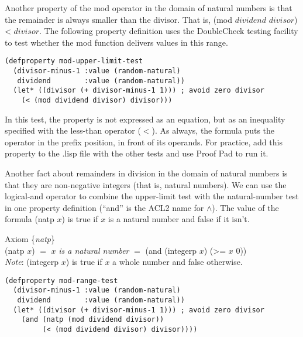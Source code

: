 Another property of the \textsf{mod} operator
in the domain of natural numbers
is that the remainder
is always smaller than the divisor.
That is, \textsf{(mod $dividend$ $divisor$)} < $divisor$.
The following property definition uses
the DoubleCheck testing facility
to test whether the \textsf{mod} function delivers values in this range.

\begin{Verbatim}
(defproperty mod-upper-limit-test
  (divisor-minus-1 :value (random-natural)
   dividend        :value (random-natural))
  (let* ((divisor (+ divisor-minus-1 1))) ; avoid zero divisor
    (< (mod dividend divisor) divisor)))
\end{Verbatim}

In this test, the property is not expressed as an equation,
but as an inequality
specified with the less-than operator ($<$).
As always, the formula puts the operator in the prefix position,
in front of its operands.
For practice, add this property to the .lisp file with the other tests and 
use Proof Pad to run it.

Another fact about remainders in division in the domain of natural numbers is that
they are non-negative integers (that is, natural numbers).
We can use the logical-and operator
to combine the upper-limit test with the natural-number test
in one property definition
(``\textsf{and}'' is the ACL2 name for $\wedge$).
\label{natp-op}The value of the formula 
\textsf{(natp $x$)} is true
if $x$ is a natural number and false if it isn't.

\label{natp-axiom-formal}
\begin{center}
Axiom \{\emph{natp}\} \\
(natp $x$) $=$ $x$ \emph{is a natural number} $=$ \textsf{(and (integerp $x$) (>= $x$ 0))}\\
\emph{Note}: \textsf{(integerp $x$)} is true if $x$ a whole number and false otherwise.
\end{center}

\begin{Verbatim}
(defproperty mod-range-test
  (divisor-minus-1 :value (random-natural)
   dividend        :value (random-natural))
  (let* ((divisor (+ divisor-minus-1 1))) ; avoid zero divisor
    (and (natp (mod dividend divisor))
         (< (mod dividend divisor) divisor))))
\end{Verbatim}

